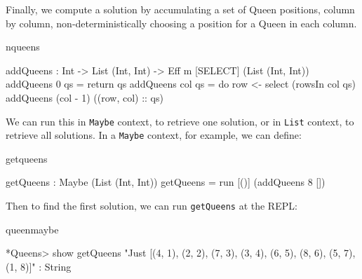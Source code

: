 \noindent
Finally, we compute a solution by accumulating a set of Queen positions,
column by column, non-deterministically choosing a position for a Queen in
each column.

\begin{SaveVerbatim}{nqueens}

addQueens : Int -> List (Int, Int) -> 
            Eff m [SELECT] (List (Int, Int))
addQueens 0   qs = return qs
addQueens col qs 
   = do row <- select (rowsIn col qs)
        addQueens (col - 1) ((row, col) :: qs)

\end{SaveVerbatim}

\noindent
We can run this in \texttt{Maybe} context, to retrieve one solution, or in
\texttt{List} context, to retrieve all solutions. In a
\texttt{Maybe} context, for example, we can define:

\begin{SaveVerbatim}{getqueens}

getQueens : Maybe (List (Int, Int))
getQueens = run [()] (addQueens 8 [])

\end{SaveVerbatim}

\noindent
Then to find the first solution, we can run \texttt{getQueens} at the \Idris{}
REPL:

\begin{SaveVerbatim}{queenmaybe}

*Queens> show getQueens
"Just [(4, 1), (2, 2), (7, 3), (3, 4), 
       (6, 5), (8, 6), (5, 7), (1, 8)]" : String

\end{SaveVerbatim}


